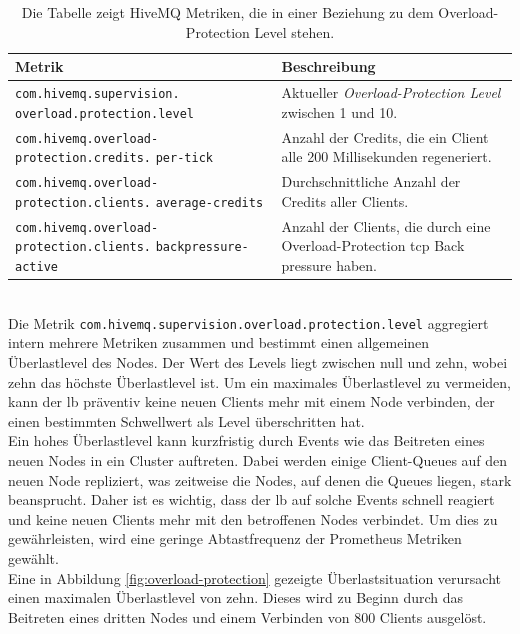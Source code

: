 \begin{table}[htbp]
\centering
\renewcommand{\arraystretch}{1.5}
\begin{tabularx}{\textwidth}{|p{5cm}|X|}
    \hline
    \textbf{Metrik} & \textbf{Beschreibung} \\
    \hline
    \hline
    \verb|com.hivemq.supervision.| \verb|overload.protection.level| & Aktueller \textit{Overload-Protection Level} zwischen 1 und 10. \\
    \hline
    \verb|com.hivemq.overload-| \verb|protection.credits.| \verb|per-tick| & Anzahl der Credits, die ein Client alle 200 Millisekunden regeneriert. \\
    \hline
    \verb|com.hivemq.overload-| \verb|protection.clients.| \verb|average-credits| & Durchschnittliche Anzahl der Credits aller Clients. \\
    \hline
    \verb|com.hivemq.overload-| \verb|protection.clients.| \verb|backpressure-active| & Anzahl der Clients, die durch eine Overload-Protection \ac{tcp} Back pressure haben. \\
    \hline
\end{tabularx}
\caption{Die Tabelle zeigt HiveMQ Metriken, die in einer Beziehung zu dem Overload-Protection Level stehen.}
\label{table:overload-protection-metrics}
\end{table}
\\
Die Metrik \verb|com.hivemq.supervision.overload.protection.level| aggregiert intern \newline mehrere Metriken zusammen und bestimmt einen allgemeinen Überlastlevel des Nodes. Der Wert des Levels liegt zwischen null und zehn, wobei zehn das höchste Überlastlevel ist.
Um ein maximales Überlastlevel zu vermeiden, kann der \acl{lb} präventiv keine neuen Clients mehr mit einem Node verbinden, der einen bestimmten Schwellwert als Level überschritten hat.
\\
Ein hohes Überlastlevel kann kurzfristig durch Events wie das Beitreten eines neuen Nodes in ein Cluster auftreten. Dabei werden einige Client-Queues auf den neuen Node repliziert, was zeitweise die Nodes, auf denen die Queues liegen, stark beansprucht. Daher ist es wichtig, dass der \ac{lb} auf solche Events schnell reagiert und keine neuen Clients mehr mit den betroffenen Nodes verbindet.
Um dies zu gewährleisten, wird eine geringe Abtastfrequenz der Prometheus Metriken gewählt.
\\
Eine in Abbildung \ref{fig:overload-protection} gezeigte Überlastsituation verursacht einen maximalen Überlastlevel von zehn. Dieses wird zu Beginn durch das Beitreten eines dritten Nodes und einem Verbinden von 800 Clients ausgelöst.
